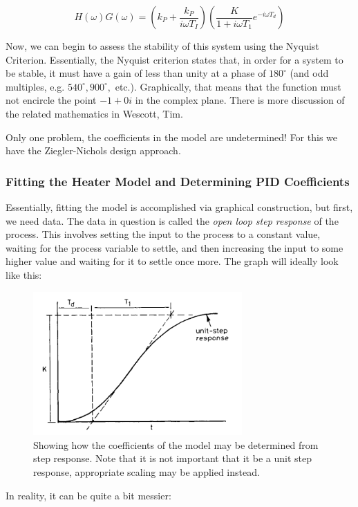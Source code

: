 \documentclass[11pt, letterpaper]{article}
\begin{document}
$$ H(\omega)G(\omega) = \left( k_P + \frac{k_P}{i \omega T_I}\right)\left( \frac{K}{1+i\omega T_{1}} e^{-i \omega T_d} \right)$$

Now, we can begin to assess the stability of this system using the Nyquist Criterion. Essentially, the Nyquist criterion states that, in order for a system to be stable, it must have a gain of less than unity at a phase of $180^{\circ}$ (and odd multiples, e.g. $540^{\circ},900^{\circ},$ etc.). Graphically, that means that the function must not encircle the point $-1+0i$ in the complex plane. There is more discussion of the related mathematics in Wescott, Tim.

Only one problem, the coefficients in the model are undetermined! For this we have the Ziegler-Nichols design approach.

\subsubsection{Fitting the Heater Model and Determining PID Coefficients}
Essentially, fitting the model is accomplished via graphical construction, but first, we need data. The data in question is called the {\it open loop step response} of the process. This involves setting the input to the process to a constant value, waiting for the process variable to settle, and then increasing the input to some higher value and waiting for it to settle once more. The graph will ideally look like this:

\begin{figure}[H]
    \centering
    \includegraphics[width=8cm]{openLoopStep.png}
    \caption{ Showing how the coefficients of the model may be determined from step response. Note that it is not important that it be a unit step response, appropriate scaling may be applied instead. }
    \label{fig:openLoopStep}
\end{figure}

In reality, it can be quite a bit messier:
\end{document}
